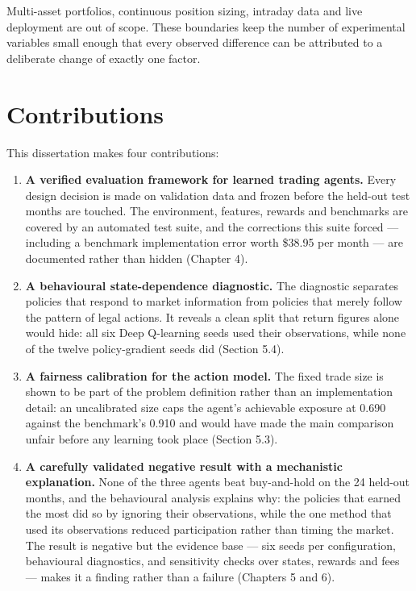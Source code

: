 Multi-asset portfolios, continuous position sizing, intraday data and live
deployment are out of scope. These boundaries keep the number of
experimental variables small enough that every observed difference can be
attributed to a deliberate change of exactly one factor.

\section{Contributions}

This dissertation makes four contributions:

\begin{enumerate}
\def\labelenumi{\arabic{enumi}.}
\item
  \textbf{A verified evaluation framework for learned trading agents.}
  Every design decision is made on validation data and frozen before the
  held-out test months are touched. The environment, features, rewards
  and benchmarks are covered by an automated test suite, and the
  corrections this suite forced --- including a benchmark implementation
  error worth \$38.95 per month --- are documented rather than hidden
  (Chapter 4).
\item
  \textbf{A behavioural state-dependence diagnostic.} The diagnostic
  separates policies that respond to market information from policies
  that merely follow the pattern of legal actions. It reveals a clean
  split that return figures alone would hide: all six Deep Q-learning
  seeds used their observations, while none of the twelve policy-gradient
  seeds did (Section 5.4).
\item
  \textbf{A fairness calibration for the action model.} The fixed trade
  size is shown to be part of the problem definition rather than an
  implementation detail: an uncalibrated size caps the agent's achievable
  exposure at 0.690 against the benchmark's 0.910 and would have made the
  main comparison unfair before any learning took place (Section 5.3).
\item
  \textbf{A carefully validated negative result with a mechanistic
  explanation.} None of the three agents beat buy-and-hold on the 24
  held-out months, and the behavioural analysis explains why: the
  policies that earned the most did so by ignoring their observations,
  while the one method that used its observations reduced participation
  rather than timing the market. The result is negative but the evidence
  base --- six seeds per configuration, behavioural diagnostics, and
  sensitivity checks over states, rewards and fees --- makes it a finding
  rather than a failure (Chapters 5 and 6).
\end{enumerate}

